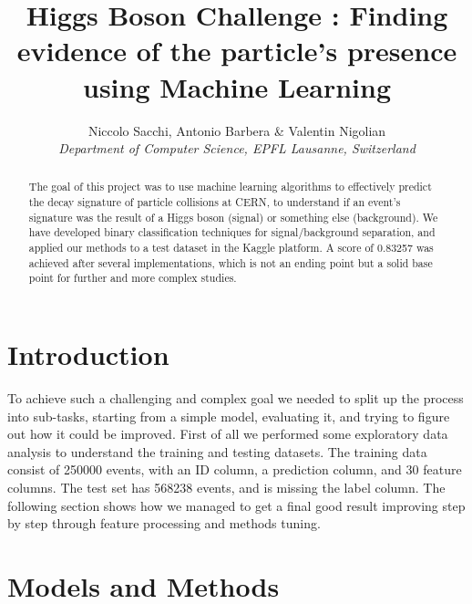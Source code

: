 \documentclass[10pt,conference,compsocconf]{IEEEtran}
\begin{document}
\title{Higgs Boson Challenge : Finding evidence of the particle's presence using Machine Learning}

\author{
  Niccolo Sacchi, Antonio Barbera \& Valentin Nigolian\\
  \textit{Department of Computer Science, EPFL Lausanne, Switzerland}
}

\maketitle

\begin{abstract}
  The goal of this project was to use machine learning algorithms to effectively predict the decay signature of particle collisions at CERN, to understand if an event's signature was the result of a Higgs boson (signal) or something else (background). We have developed binary classification techniques for signal/background separation, and applied our methods to a test dataset in the Kaggle platform.
  A score of 0.83257 was achieved after several implementations, which is not an ending point but a solid base point for further and more complex studies.
\end{abstract}

\section{Introduction}

To achieve such a challenging and complex goal we needed to split up the process into sub-tasks, starting from a simple model, evaluating it, and trying to figure out how it could be improved.
First of all we performed some exploratory data analysis to understand the training and testing datasets. The training data consist of 250000 events, with an ID column, a prediction column, and 30 feature columns. The test set has 568238 events, and is missing the label column.
The following section shows how we managed to get a final good result improving step by step through feature processing and methods tuning.



\section{Models and Methods}
\label{sec:mod_meth}
\end{document}
